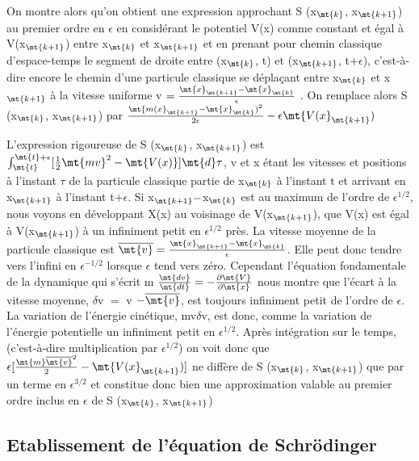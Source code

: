 On montre alors qu'on obtient une expression approchant S (x$_\mt{k}$, x$_\mt{k+1}$)
au premier ordre en $\epsilon$ en considérant le potentiel V(x)
comme constant et égal à V(x$_\mt{k+1}$) entre x$_\mt{k}$ et x$_\mt{k+1}$ et en prenant pour
chemin classique d'espace-temps le segment de droite entre (x$_\mt{k}$, t) et
(x$_\mt{k+1}$, t$+\epsilon$), c'est-à-dire encore le chemin d'une particule classique se
déplaçant entre x$_\mt{k}$ et x$_\mt{k+1}$ à la vitesse uniforme
v $= \frac{\mt{x}_\mt{k+1} - \mt{x}_\mt{k}}{\epsilon}$ . On remplace alors
S (x$_\mt{k}$, x$_\mt{k+1}$)  par
$\frac{\mt{m(x}_\mt{k+1} - \mt{x}_\mt{k})^2}{2\epsilon} - \epsilon\mt{V(x}_\mt{k+1})$

L'expression rigoureuse de S (x$_\mt{k}$, x$_\mt{k+1}$) est
$\int_\mt{t}^{\mt{t}+\epsilon}[\frac{1}{2}\mt{mv}^2 - \mt{V(x)}]\mt{d}\tau$, v et x
étant les vitesses et positions à l'instant $\tau$ de la particule classique
partie de x$_\mt{k}$ à l'instant t et arrivant en x$_\mt{k+1}$ à l'instant t$+\epsilon$. Si 
x$_\mt{k+1}-$x$_\mt{k}$
est au maximum de l'ordre de $\epsilon^{1/2}$, nous voyons en développant X(x)
au voisinage de V(x$_\mt{k+1}$), que V(x) est égal à V(x$_\mt{k+1}$) à un infiniment petit en 
$\epsilon^{1/2}$
près. La vitesse moyenne de la particule classique est
$\overline{\mt{v}}= \frac{\mt{x}_\mt{k+1}-\mt{x}_\mt{k}}{\epsilon}$.  Elle
peut donc tendre vers l'infini en $\epsilon^{-1/2}$ lorsque $\epsilon$ tend vers zéro. Cependant
l'équation fondamentale de la dynamique qui s'écrit
m $\frac{\mt{dv}}{\mt{dt}}=-\frac{\partial\mt{V}}{\partial\mt{x}}$
nous montre que l'écart à la vitesse moyenne, $\delta$v $=$ v $-\overline{\mt{v}}$, est toujours infiniment
petit de l'ordre de $\epsilon$. La variation de l'énergie cinétique,
mv$\delta$v, est donc,
comme la variation de l'énergie potentielle un infiniment petit en $\epsilon^{1/2}$.
Après intégration sur le temps, (c'est-à-dire multiplication par $\epsilon^{1/2}$) on voit
donc que 
$\epsilon[\frac{\mt{m}\overline{\mt{v}}^2}{2}-\mt{V(x}_\mt{k+1})]$
ne diffère de S (x$_\mt{k}$, x$_\mt{k+1}$) que par un terme
en $\epsilon^{3/2}$ et constitue donc bien une approximation valable au premier ordre
inclus en $\epsilon$ de S (x$_\mt{k}$, x$_\mt{k+1}$)
%

\subsection{Etablissement de l'équation de Schrödinger}

